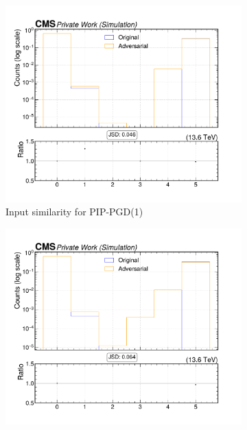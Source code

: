 \begin{figure}[htbp]
  \centering
  \begin{subfigure}[t]{0.32\textwidth}
    \includegraphics[width=\linewidth]{media/output/features/compare/combined_it_1/cmp_cpf_arr_Cpfcan_quality.pdf}
    \caption*{Input similarity for PIP-PGD(1)}
  \end{subfigure}\hfill
  \begin{subfigure}[t]{0.32\textwidth}
    \includegraphics[width=\linewidth]{media/output/features/compare/combined_it_2/cmp_cpf_arr_Cpfcan_quality.pdf}

\end{subfigure}
\end{figure}
